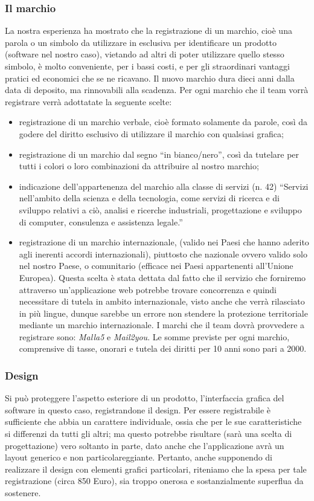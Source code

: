 \subsubsection{Il marchio}
La nostra esperienza ha mostrato che la registrazione di un marchio, cioè una parola o un simbolo da utilizzare in esclusiva per identificare un prodotto (software nel nostro caso), vietando ad altri di poter utilizzare quello stesso simbolo, è molto conveniente, per i bassi costi, e per gli straordinari vantaggi pratici ed economici che se ne ricavano. Il nuovo marchio dura dieci anni dalla data di deposito, ma rinnovabili alla scadenza. Per ogni marchio che il team vorrà registrare verrà adottatate la seguente scelte:
\begin{itemize}
\item registrazione di un marchio verbale, cioè formato solamente da parole, così da godere del diritto esclusivo di utilizzare il marchio con qualsiasi grafica;
\item registrazione di un marchio dal segno ``in bianco/nero'', così da tutelare per tutti i colori o loro combinazioni da attribuire al nostro marchio;
\item indicazione dell'appartenenza del marchio alla classe di servizi (n. 42) ``Servizi nell'ambito della scienza e della tecnologia, come servizi di ricerca e di sviluppo relativi a ciò, analisi e ricerche industriali, progettazione e sviluppo di computer, consulenza e assistenza legale.''
\item registrazione di un marchio internazionale, (valido nei Paesi che hanno aderito agli inerenti accordi internazionali), piuttosto che nazionale ovvero valido solo nel nostro Paese, o  comunitario (efficace nei Paesi appartenenti all'Unione Europea). Questa scelta è stata dettata dal fatto che il servizio che forniremo attraverso un'applicazione web potrebbe trovare concorrenza e quindi necessitare di tutela in ambito internazionale, visto anche che verrà rilasciato in più lingue, dunque sarebbe un errore non stendere la protezione territoriale mediante un marchio internazionale.
I marchi che il team dovrà provvedere a registrare sono: \textit{Malla5} e \textit{Mail2you}. Le somme previste per ogni marchio, comprensive di tasse, onorari e tutela dei diritti per 10 anni sono pari a 2000\officialeuro.
\end{itemize}

\subsubsection{Design}
Si può proteggere l'aspetto esteriore di un prodotto, l'interfaccia grafica del software in questo caso, registrandone il design. Per essere registrabile è sufficiente che abbia un carattere individuale, ossia che per le sue caratteristiche si differenzi da tutti gli altri; ma questo potrebbe risultare (sarà una scelta di progettazione) vero soltanto in parte, dato anche che l'applicazione avrà un layout generico e non particolareggiante. Pertanto, anche supponendo di realizzare il design con elementi grafici particolari, riteniamo che la spesa per tale registrazione (circa 850 Euro), sia troppo onerosa e sostanzialmente superflua da sostenere.


